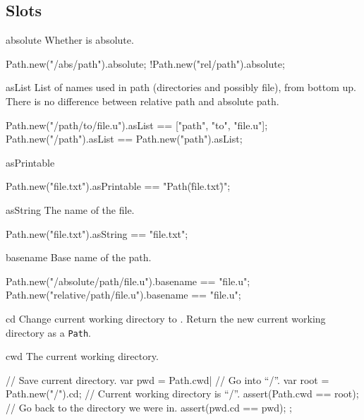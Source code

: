 \subsection{Slots}
\begin{urbiscriptapi}
\item[absolute]
  Whether \this is absolute.
\begin{urbiassert}
Path.new("/abs/path").absolute;
!Path.new("rel/path").absolute;
\end{urbiassert}

\item[asList]
  List of names used in path (directories and possibly file), from
  bottom up. There is no difference between relative path and absolute
  path.
\begin{urbiassert}
Path.new("/path/to/file.u").asList == ["path", "to", "file.u"];
Path.new("/path").asList           == Path.new("path").asList;
\end{urbiassert}

\item[asPrintable]
\begin{urbiassert}
Path.new("file.txt").asPrintable == "Path(\"file.txt\")";
\end{urbiassert}

\item[asString]
  The name of the file.
\begin{urbiassert}
Path.new("file.txt").asString == "file.txt";
\end{urbiassert}

\item[basename]
  Base name of the path.
\begin{urbiassert}
Path.new("/absolute/path/file.u").basename == "file.u";
Path.new("relative/path/file.u").basename  == "file.u";
\end{urbiassert}

\item[cd]
  Change current working directory to \this. Return the new
  current working directory as a \lstinline|Path|.

\item[cwd]
  The current working directory.
\begin{urbiscript}
{
  // Save current directory.
  var pwd = Path.cwd|
  // Go into ``/''.
  var root = Path.new("/").cd;
  // Current working directory is ``/''.
  assert(Path.cwd == root);
  // Go back to the directory we were in.
  assert(pwd.cd == pwd);
};
\end{urbiscript}


\end{urbiscriptapi}
